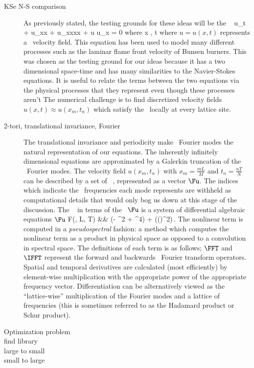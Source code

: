 \begin{description}
\item[KSe N-S comparison]
As previously stated, the testing grounds for these ideas will be the \spt\ \KSe
\beq \label{e-ks}
u_t + u_{xx} + u_{xxxx} + u u_x = 0 \quad \mbox{where} \quad x \in [0,L], t\in [0,T]
\eeq
where $u = u(x, t)$ represents a \spt\ velocity field. This
equation has been used to model many different processes such as
the laminar flame front velocity of Bunsen burners.
This was chosen as the testing ground for our ideas because it has
a two dimensional space-time and has many similarities to the Navier-Stokes
equations. It is useful to relate the terms between the two equations via
the physical processes that they represent even though these processes aren't
The numerical challenge is to find
discretized velocity fields $u(x, t) \approx u(x_m, t_n)$
which satisfy the \KSe\ locally at every lattice site.

\item[2-tori, translational invariance, Fourier]
The translational invariance and periodicity make
\spt\ Fourier modes the natural representation of our equations.
The inherently infinitely dimensional equations are approximated
by a Galerkin truncation of the \spt\ Fourier modes.
The velocity field $u(x_m, t_n)$ with $x_m = \frac{mL}{M}$ and $t_n = \frac{nT}{N}$
can be described by a set of \spt\ \Fcs, represented as a vector $\Fu$. The indices
which indicate the \spt\ frequencies each mode represents are withheld as computational
details that would only bog us down at this stage of the discussion.
The \KSe\  in terms of the \Fcs\ $\Fu$ is a
system of differential algebraic equations
$\Fu$
\bea \label{e-kssFb}
F(\Fu, L, T) &\equiv& (\omegaj - \wavek^2 + \wavek^4) \Fu +  \FFT(\IFFT(\Fu)^2)\,.
\eea
The nonlinear term is computed in a \emph{pseudospectral} fashion: a method which computes the
nonlinear term as a product in physical space as opposed to a convolution in spectral space.
The definitions of each term is as follows; $\FFT$ and $\IFFT$ represent the forward and backwards
\spt\ Fourier transform operators. Spatial and temporal derivatives are calculated (most efficiently)
by element-wise multiplication with the appropriate power of the appropriate frequency vector.
Differentiation can be alternatively viewed as the ``lattice-wise'' multiplication of
the Fourier modes and a lattice of frequencies (this is sometimes referred to as the Hadamard product
or Schur product).

\item[Optimization problem]

\item[find library]
\item[large to small]
\item[small to large]
\end{description}
